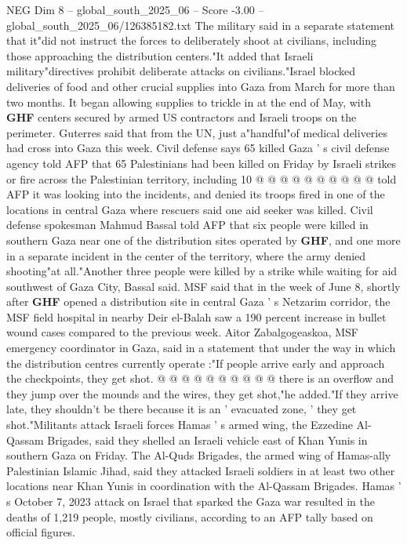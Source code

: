 \begin{textsample}{NEG Dim 8 – global\_south\_2025\_06 – Score -3.00 – global\_south\_2025\_06/126385182.txt}
The military said in a separate statement that it"did not instruct the forces to deliberately shoot at civilians, including those approaching the distribution centers."It added that Israeli military"directives prohibit deliberate attacks on civilians."Israel blocked deliveries of food and other crucial supplies into Gaza from March for more than two months.
It began allowing supplies to trickle in at the end of May, with \textbf{GHF} centers secured by armed US contractors and Israeli troops on the perimeter.
Guterres said that from the UN, just a"handful"of medical deliveries had cross into Gaza this week.
Civil defense says 65 killed Gaza ' s civil defense agency told AFP that 65 Palestinians had been killed on Friday by Israeli strikes or fire across the Palestinian territory, including 10 @ @ @ @ @ @ @ @ @ @ told AFP it was looking into the incidents, and denied its troops fired in one of the locations in central Gaza where rescuers said one aid seeker was killed.
Civil defense spokesman Mahmud Bassal told AFP that six people were killed in southern Gaza near one of the distribution sites operated by \textbf{GHF}, and one more in a separate incident in the center of the territory, where the army denied shooting"at all."Another three people were killed by a strike while waiting for aid southwest of Gaza City, Bassal said.
MSF said that in the week of June 8, shortly after \textbf{GHF} opened a distribution site in central Gaza ' s Netzarim corridor, the MSF field hospital in nearby Deir el-Balah saw a 190 percent increase in bullet wound cases compared to the previous week.
Aitor Zabalgogeaskoa, MSF emergency coordinator in Gaza, said in a statement that under the way in which the distribution centres currently operate :"If people arrive early and approach the checkpoints, they get shot. @ @ @ @ @ @ @ @ @ @ there is an overflow and they jump over the mounds and the wires, they get shot,"he added."If they arrive late, they shouldn't be there because it is an ' evacuated zone, ' they get shot."Militants attack Israeli forces Hamas ' s armed wing, the Ezzedine Al-Qassam Brigades, said they shelled an Israeli vehicle east of Khan Yunis in southern Gaza on Friday.
The Al-Quds Brigades, the armed wing of Hamas-ally Palestinian Islamic Jihad, said they attacked Israeli soldiers in at least two other locations near Khan Yunis in coordination with the Al-Qassam Brigades.
Hamas ' s October 7, 2023 attack on Israel that sparked the Gaza war resulted in the deaths of 1,219 people, mostly civilians, according to an AFP tally based on official figures.

\end{textsample}
